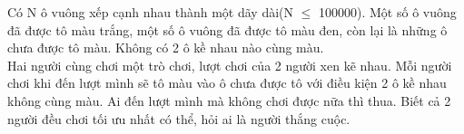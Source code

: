 Có N ô vuông xếp cạnh nhau thành một dãy dài(N $\le$ 100000). Một số ô vuông đã được tô màu trắng, một số ô vuông đã được tô màu đen, còn lại là những ô chưa được tô màu. Không có 2 ô kề nhau nào cùng màu.   
\\   Hai người cùng chơi một trò chơi, lượt chơi của 2 người xen kẽ nhau. Mỗi người chơi khi đến lượt mình sẽ tô màu vào ô chưa được tô với điều kiện 2 ô kề nhau không cùng màu. Ai đến lượt mình mà không chơi được nữa thì thua. Biết cả 2 người đều chơi tối ưu nhất có thể, hỏi ai là người thắng cuộc.  

\